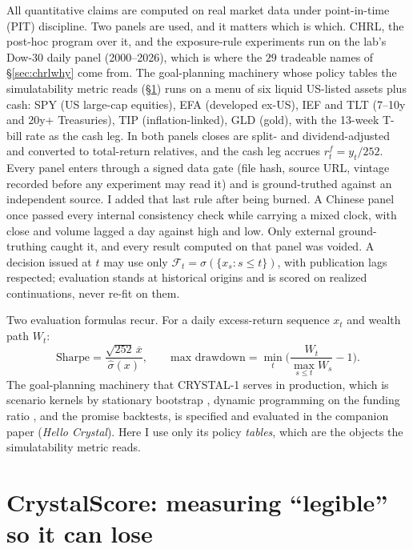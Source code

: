 \documentclass[11pt]{article}
\begin{document}
All quantitative claims are computed on real market data under point-in-time (PIT) discipline.
Two panels are used, and it matters which is which. CHRL, the post-hoc program over it, and the
exposure-rule experiments run on the lab's Dow-30 daily panel (2000--2026), which is where the
$29$ tradeable names of \S\ref{sec:chrlwhy} come from. The goal-planning machinery whose policy
tables the simulatability metric reads (\S\ref{sec:metrics}) runs on a menu of six liquid
US-listed assets plus cash: SPY (US large-cap equities), EFA (developed ex-US), IEF and TLT
(7--10y and 20y+ Treasuries), TIP (inflation-linked), GLD (gold), with the 13-week T-bill rate as
the cash leg. In both panels closes are split- and dividend-adjusted and converted to
total-return relatives, and the cash leg accrues $r^f_t = y_t/252$. Every panel enters through a signed data gate (file
hash, source URL, vintage recorded before any experiment may read it) and is ground-truthed
against an independent source. I added that last rule after being burned. A Chinese panel once
passed every internal consistency check while carrying a mixed clock, with close and volume
lagged a day against high and low. Only external ground-truthing caught it, and every result
computed on that panel was voided. A decision issued at $t$ may use only
$\mathcal{F}_t = \sigma(\{x_s : s\le t\})$, with publication lags respected; evaluation stands
at historical origins and is scored on realized continuations, never re-fit on them.

Two evaluation formulas recur. For a daily excess-return sequence $x_t$ and wealth path $W_t$:
\begin{equation}
\text{Sharpe} = \frac{\sqrt{252}\,\overline{x}}{\hat\sigma(x)}, \qquad
\text{max drawdown} = \min_{t}\Big(\frac{W_t}{\max_{s\le t} W_s} - 1\Big).
\label{eq:mdd}
\end{equation}
The goal-planning machinery that CRYSTAL-1 serves in production, which is scenario kernels by
stationary bootstrap \citep{politis1994}, dynamic programming on the funding ratio
\citep{das2020goals,browne1999}, and the promise backtests, is specified and evaluated in
the companion paper (\emph{Hello Crystal}). Here I use only its policy \emph{tables}, which
are the objects the simulatability metric reads.

\section{CrystalScore: measuring ``legible'' so it can lose}
\label{sec:metrics}
\end{document}
